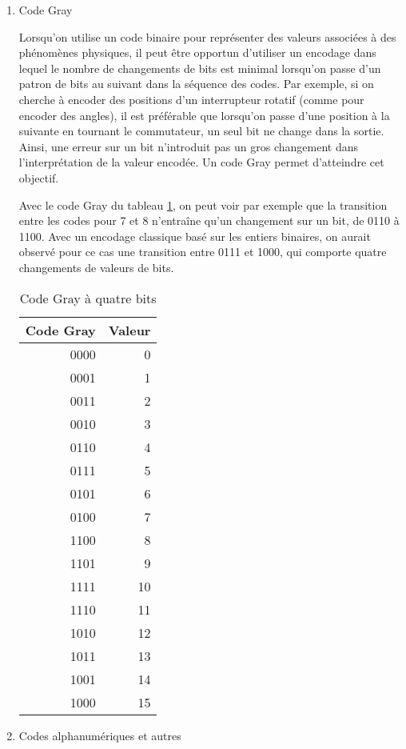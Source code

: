 \documentclass[letter, oneside]{book}
\begin{document}
\begin{enumerate}
\item Code Gray
\label{sec:org69df59f}

Lorsqu'on utilise un code binaire pour représenter des valeurs
associées à des phénomènes physiques, il peut être opportun d'utiliser
un encodage dans lequel le nombre de changements de bits est minimal
lorsqu'on passe d'un patron de bits au suivant dans la séquence des
codes. Par exemple, si on cherche à encoder des positions d'un
interrupteur rotatif (comme pour encoder des angles), il est
préférable que lorsqu'on passe d'une position à la suivante en tournant
le commutateur, un seul bit ne change dans la sortie. Ainsi, une
erreur sur un bit n'introduit pas un gros changement dans
l'interprétation de la valeur encodée. Un code Gray permet d'atteindre
cet objectif.

Avec le code Gray du tableau \ref{tab:org8c9e259}, on peut voir par exemple que la
transition entre les codes pour 7 et 8 n'entraîne qu'un changement sur
un bit, de 0110 à 1100. Avec un encodage classique basé sur les
entiers binaires, on aurait observé pour ce cas une transition entre
0111 et 1000, qui comporte quatre changements de valeurs de bits.

\begin{table}[htbp]
\caption{\label{tab:org8c9e259}Code Gray à quatre bits}
\centering
\begin{tabular}{rr}
Code Gray & Valeur\\[0pt]
\hline
0000 & 0\\[0pt]
0001 & 1\\[0pt]
0011 & 2\\[0pt]
0010 & 3\\[0pt]
0110 & 4\\[0pt]
0111 & 5\\[0pt]
0101 & 6\\[0pt]
0100 & 7\\[0pt]
1100 & 8\\[0pt]
1101 & 9\\[0pt]
1111 & 10\\[0pt]
1110 & 11\\[0pt]
1010 & 12\\[0pt]
1011 & 13\\[0pt]
1001 & 14\\[0pt]
1000 & 15\\[0pt]
\end{tabular}
\end{table}


\item Codes alphanumériques et autres
\label{sec:orgd54ce12}


\end{enumerate}
\end{document}

